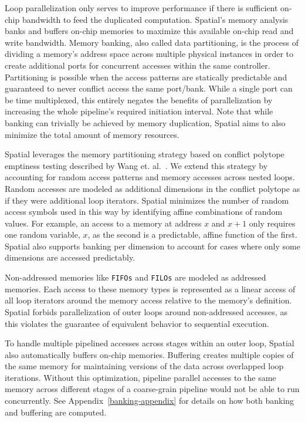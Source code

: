 Loop parallelization only serves to improve performance if there is sufficient on-chip bandwidth to feed the duplicated computation.
Spatial's memory analysis banks and buffers on-chip memories to maximize this available on-chip read and write bandwidth.
Memory banking, also called data partitioning, is the process of dividing a memory's address space across multiple physical instances in order to create
additional ports for concurrent accesses within the same controller.
Partitioning is possible when the access patterns are statically predictable and guaranteed to never conflict access the same port/bank.
While a single port can be time multiplexed, this entirely negates the benefits of parallelization by increasing the whole pipeline's required initiation interval.
Note that while banking can trivially be achieved by memory duplication, Spatial aims to also minimize the total amount of memory resources.

Spatial leverages the memory partitioning strategy based on conflict polytope emptiness testing described by Wang et. al.~\cite{Wang_banking}. We extend this strategy by accounting for random access patterns and memory accesses across nested loops. Random accesses are modeled as additional dimensions in the conflict polytope as if they were additional loop iterators. Spatial minimizes the number of random access symbols used in this way by identifying affine combinations of random values. For example, an access to a memory at address $x$ and $x+1$ only requires one random variable, $x$, as the second is a predictable, affine function of the first.
Spatial also supports banking per dimension to account for cases where only some dimensions are accessed predictably.

Non-addressed memories like \texttt{\small{FIFOs}} and \texttt{\small{FILOs}} are modeled as addressed memories.
Each access to these memory types is represented as a linear access of all loop iterators around the memory access relative to the memory's definition. Spatial forbids parallelization of outer loops around non-addressed accesses, as this violates the guarantee of equivalent behavior to sequential execution.

To handle multiple pipelined accesses across stages within an outer loop, Spatial also automatically buffers on-chip memories.
Buffering creates multiple copies of the
same memory for maintaining versions of the data across overlapped loop iterations.
Without this optimization, pipeline parallel accesses to the same memory across different stages of a coarse-grain pipeline would not be able to run concurrently.
See Appendix~\ref{banking-appendix} for details on how both banking and buffering are computed.


